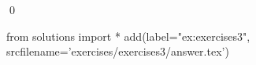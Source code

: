 
\begin{ex} 
  \label{ex:exercises3}
  
  \qed
\end{ex} 
\begin{python0}
from solutions import *
add(label="ex:exercises3",
    srcfilename='exercises/exercises3/answer.tex') 
\end{python0}
